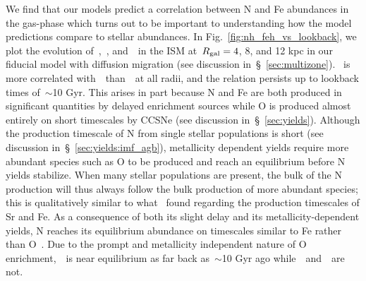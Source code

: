 \documentclass[ms.tex]{subfiles}
\begin{document}
We find that our models predict a correlation between N and Fe abundances in
the gas-phase which turns out to be important to understanding how the model
predictions compare to stellar abundances.
In Fig.~\ref{fig:nh_feh_vs_lookback}, we plot the evolution of~\nh,~\oh,
and~\feh~in the ISM at~$R_\text{gal} = 4$, 8, and 12 kpc in our fiducial model
with diffusion migration (see discussion in~\S~\ref{sec:multizone}).
\nh~is more correlated with~\feh~than~\oh~at all radii, and the relation
persists up to lookback times of~$\sim$10 Gyr.
This arises in part because N and Fe are both produced in significant
quantities by delayed enrichment sources while O is produced almost entirely on
short timescales by CCSNe (see discussion in~\S~\ref{sec:yields}).
Although the production timescale of N from single stellar populations is
short (see discussion in~\S~\ref{sec:yields:imf_agb}), metallicity dependent
yields require more abundant species such as O to be produced and reach an
equilibrium before N yields stabilize.
When many stellar populations are present, the bulk of the N production will
thus always follow the bulk production of more abundant species; this is 
qualitatively similar to what~\citet{Johnson2020} found regarding the
production timescales of Sr and Fe.
As a consequence of both its slight delay and its metallicity-dependent
yields, N reaches its equilibrium abundance on timescales similar to Fe rather
than O~\citep{Weinberg2017}.
Due to the prompt and metallicity independent nature of O enrichment,~\oh~is
near equilibrium as far back as~$\sim$10 Gyr ago while~\nh~and~\feh~are not.
\par
\end{document}
